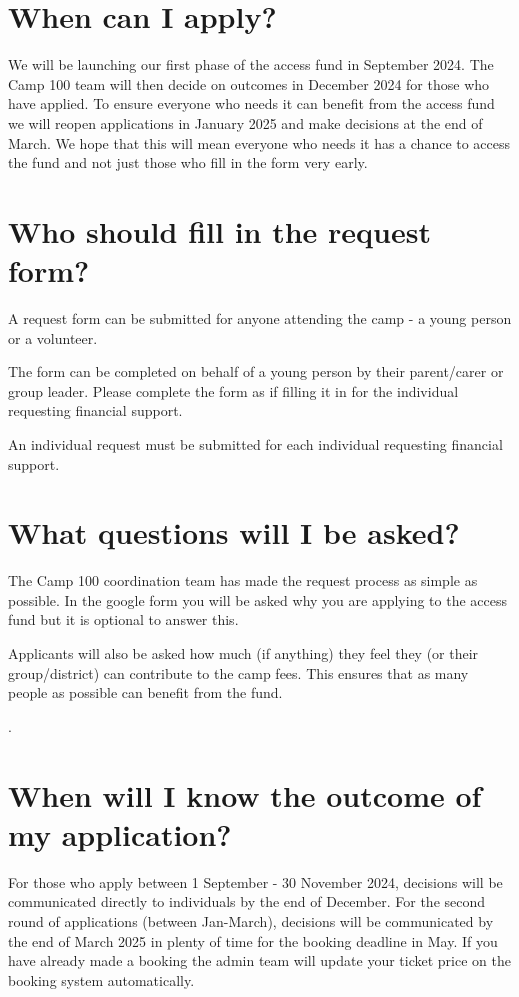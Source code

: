 \documentclass[a4paper, 11pt]{article}
\begin{document}
\section{When can I apply?}
We will be launching our first phase of the access fund in September 2024. The Camp 100 team will then decide on outcomes in December 2024 for those who have applied. To ensure everyone who needs it can benefit from the access fund we will reopen applications in January 2025 and make decisions at the end of March. We hope that this will mean everyone who needs it has a chance to access the fund and not just those who fill in the form very early. 

\section{Who should fill in the request form?}
A request form can be submitted for anyone attending the camp - a young person or a volunteer.

The form can be completed on behalf of a young person by their parent/carer or group leader. Please complete the form as if filling it in for the individual requesting financial support.

An individual request must be submitted for each individual requesting financial support.

\section{What questions will I be asked?}
The Camp 100 coordination team has made the request process as simple as possible. In the google form you will be asked why you are applying to the access fund but it is optional to answer this. 

Applicants will also be asked how much (if anything) they feel they (or their group/district) can contribute to the camp fees. This ensures that as many people as possible can benefit from the fund. 

.\section{When will I know the outcome of my application?}
For those who apply between 1 September - 30 November 2024, decisions will be communicated directly to individuals by the end of December. For the second round of applications (between Jan-March), decisions will be communicated by the end of March 2025 in plenty of time for the booking deadline in May. 
If you have already made a booking the admin team will update your ticket price on the booking system automatically. 
\end{document}
